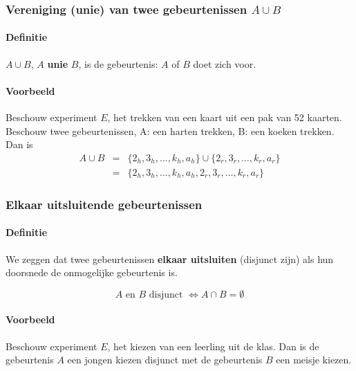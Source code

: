 \documentclass[12pt,twoside]{article}
\begin{document}
\subsubsection{Vereniging (unie) van twee gebeurtenissen $A\cup B$}

\paragraph*{Definitie}
$A\cup B$, $A$ {\bf unie} $B$, is de gebeurtenis: $A$ of $B$ doet zich voor.

\paragraph*{Voorbeeld}
Beschouw experiment $E$, het trekken van een kaart uit een pak van 52 kaarten. Beschouw twee gebeurtenissen, A: een harten trekken, B: een koeken trekken. Dan is\\
\begin{eqnarray*}
A\cup B &=& \{2_h, 3_h, \ldots, k_h,a_h\}\cup\{2_r, 3_r, \ldots, k_r, a_r\}\\
        &=& \{2_h, 3_h, \ldots, k_h, a_h, 2_r, 3_r, \ldots, k_r, a_r\}
\end{eqnarray*}

\subsubsection{Elkaar uitsluitende gebeurtenissen}

\paragraph*{Definitie}
We zeggen dat twee gebeurtenissen {\bf elkaar uitsluiten} (disjunct zijn) als hun doorsnede
de onmogelijke gebeurtenis is.\\
\begin{mdframed}
$$A\mbox{ en }B\mbox{ disjunct }\Leftrightarrow A\cap B = \emptyset$$
\end{mdframed}

\paragraph*{Voorbeeld}
Beschouw experiment $E$, het kiezen van een leerling uit de klas. Dan is de gebeurtenis $A$ een jongen kiezen disjunct met de gebeurtenis $B$ een meisje kiezen.
\end{document}
